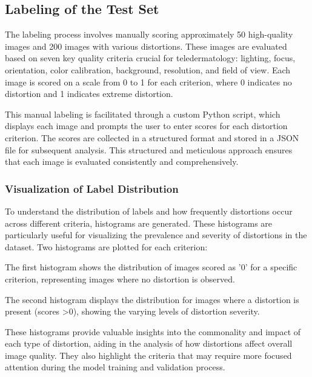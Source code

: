 \subsection{Labeling of the Test Set}
\label{sub:LabelingTestSet}
The labeling process involves manually scoring approximately 50 high-quality images and 200 images with various distortions. These images are evaluated based on seven key quality criteria crucial for teledermatology: lighting, focus, orientation, color calibration, background, resolution, and field of view. Each image is scored on a scale from 0 to 1 for each criterion, where 0 indicates no distortion and 1 indicates extreme distortion. \par
\vspace{\baselineskip}
\noindent
This manual labeling is facilitated through a custom Python script, which displays each image and prompts the user to enter scores for each distortion criterion. The scores are collected in a structured format and stored in a JSON file for subsequent analysis. This structured and meticulous approach ensures that each image is evaluated consistently and comprehensively.\par
\noindent
\subsubsection{Visualization of Label Distribution}
\label{subsub:LabelDist}
To understand the distribution of labels and how frequently distortions occur across different criteria, histograms are generated. These histograms are particularly useful for visualizing the prevalence and severity of distortions in the dataset. Two histograms are plotted for each criterion:\par
\vspace{\baselineskip}
\noindent
The first histogram shows the distribution of images scored as '0' for a specific criterion, representing images where no distortion is observed. \par
\noindent
The second histogram displays the distribution for images where a distortion is present (scores >0), showing the varying levels of distortion severity.\par
\vspace{\baselineskip}
\noindent
These histograms provide valuable insights into the commonality and impact of each type of distortion, aiding in the analysis of how distortions affect overall image quality. They also highlight the criteria that may require more focused attention during the model training and validation process. \par
{}

